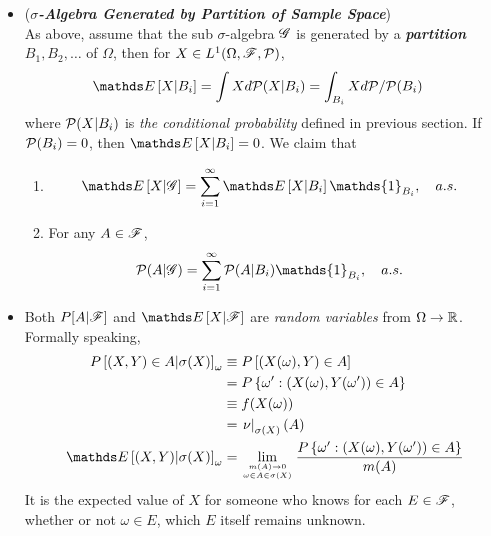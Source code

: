 \documentclass[11pt]{article}
\begin{document}
\begin{itemize}
\item \begin{remark}(\emph{\textbf{$\sigma$-Algebra Generated by Partition of Sample Space}})\\
As above, assume that the sub $\sigma$-algebra ${\mathscr G}$ is generated by a \emph{\textbf{partition}} $B_1, B_2, \ldots$ of $\Omega$, then for $X \in L^1(\Omega, {\mathscr F}, {\mathcal P})$, 
\begin{align*}
\E{}{X | B_i} &= \int X d\cP(X | B_i) = \int_{B_i} X d\cP / \cP(B_i)
\end{align*} where ${\mathcal P}(X | B_i)$ is \emph{the conditional probability} defined in previous section. If ${\mathcal P}(B_i) = 0$, then $\E{}{X | B_i} = 0$.
We claim that 
\begin{enumerate}
\item 
\begin{align*}
\E{}{X | \srG} &= \sum_{i=1}^{\infty}\E{}{X | B_i} \mathds{1}_{B_i}, \quad a.s.
\end{align*}
\item For any $A \in {\mathscr F}$,
\begin{align*}
\cP(A | \srG) &= \sum_{i=1}^{\infty}\cP(A | B_i) \mathds{1}_{B_i}, \quad a.s.
\end{align*}
\end{enumerate}
\end{remark}



\item \begin{remark}
Both $P[A | {\mathscr F}]$ and $\E{}{X| \srF}$ are \emph{random variables} from $\Omega \rightarrow {\mathbb R}$. Formally speaking, 
\begin{align*}
P\brac{(X,Y)\in A| \sigma(X)}_{\omega} &\equiv P\brac{(X(\omega), Y)\in A}\\
&= P\set{\omega': (X(\omega), Y(\omega'))\in A}\\
&\equiv f(X(\omega))\\
&= \rlat{\nu}{\sigma(X)}(A)\\
\E{}{(X,Y)| \sigma(X)}_{\omega} &= \lim\limits_{m(A)\rightarrow 0\atop \omega\in A\in \sigma(X)} \frac{P\set{\omega': (X(\omega), Y(\omega'))\in A}}{m(A)}
\end{align*}
It is the expected value of $X$ for someone who knows for each $E\in {\mathscr F}$, whether or not $\omega\in E$, which $E$ itself remains unknown.
\end{remark}


\end{itemize}
\end{document}
